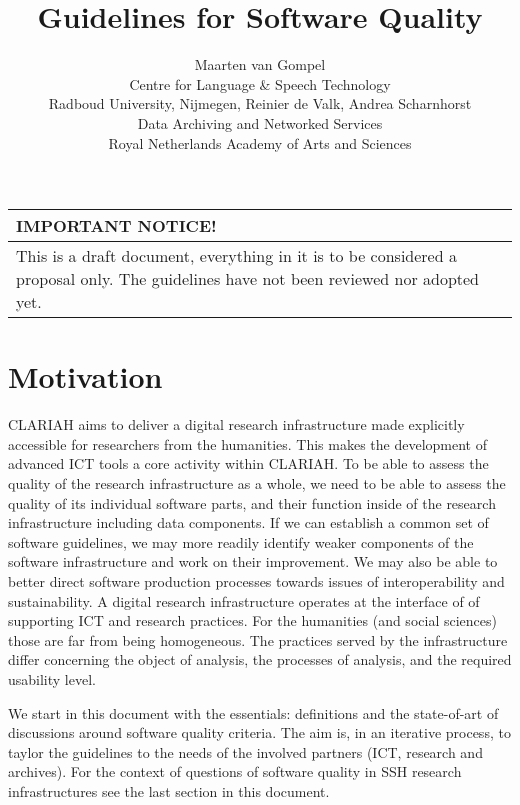 \documentclass[a4paper,11pt]{article}
\newcommand{\subtitle}[1]{%
  \posttitle{%
    \par\end{center}
    \begin{center}\large#1\end{center}
    \vskip0.5em}%
}
\newenvironment{notice}{
\begin{center}
    \begin{tabular}[h!]{|p{0.8\textwidth}|}
    \hline
    {\bf IMPORTANT NOTICE!}\\\hline}
{   \\\hline
    \end{tabular}
\end{center}}
\begin{document}
\title{Guidelines for Software Quality}
\subtitle{CLARIAH Task 54.100} 
\author{Maarten van Gompel \\ Centre for Language \& Speech Technology \\ Radboud University, Nijmegen, Reinier de Valk, Andrea Scharnhorst \\Data Archiving and Networked Services \\ Royal Netherlands Academy of Arts and Sciences}


\maketitle

\begin{notice} 
This is a draft document, everything in it is to be considered a
proposal only. The guidelines have not been reviewed nor adopted yet.
\end{notice}

\tableofcontents

\section{Motivation}

CLARIAH aims to deliver a digital research infrastructure made explicitly
accessible for researchers from the humanities. This makes the development of advanced ICT
tools a core activity within CLARIAH. To be able to assess the
quality of the research infrastructure as a whole, we need to be able to assess
the quality of its individual software parts, and their function inside of the research infrastructure including data components. If we can establish
a common set of software guidelines, we may more readily identify weaker
components of the software infrastructure and work on their improvement. We may also be able to better direct software production processes towards issues of interoperability and sustainability.
A digital research infrastructure operates at the interface of of supporting ICT and research practices. For the humanities (and social sciences) those are far from being homogeneous. The practices served by the infrastructure differ concerning the object of analysis, the processes of analysis, and the required usability level. 

We start in this document with the essentials: definitions and the state-of-art of discussions around software quality criteria. The aim is, in an iterative process, to taylor the guidelines to the needs of the involved partners (ICT, research and archives). For the context of questions of software quality in SSH research infrastructures see the last section in this document.
\end{document}
